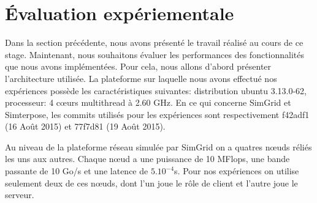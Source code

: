 \section{Évaluation expériementale}
\label{section:evaluation}

Dans la section précédente, nous avons présenté le travail réalisé au cours de ce stage. Maintenant, nous souhaitons évaluer les performances des fonctionnalités que nous avons implémentées. Pour cela, nous allons d'abord présenter l'architecture utilisée. La plateforme sur laquelle nous avons effectué nos expériences possède les caractéristiques suivantes: distribution ubuntu 3.13.0-62, processeur: 4 c\oe urs multithread à 2.60 GHz. En ce qui concerne SimGrid et Simterpose, les commits utilisés pour les expériences sont respectivement f42adf1 (16 Août 2015) et 77f7d81 (19 Août 2015). 

Au niveau de la plateforme réseau simulée par SimGrid on a quatres n\oe uds réliés les uns aux autres. Chaque n\oe ud a une puissance de 10 MFlops, une bande passante de 10 Go/s et une latence de $5.10^{-4}$s. Pour nos expériences on utilise seulement deux de ces n\oe uds, dont l'un joue le rôle de client et l'autre joue le serveur. 
